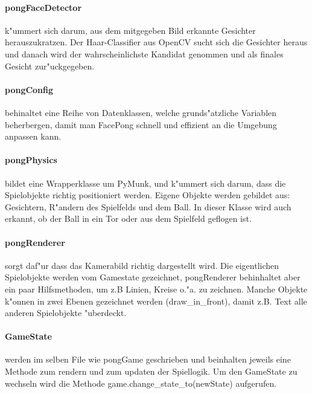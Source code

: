 \documentclass[12pt]{article}
\begin{document}
\paragraph{pongFaceDetector}
k"ummert sich darum, aus dem mitgegeben Bild erkannte Gesichter herauszukratzen.
Der Haar-Classifier aus OpenCV sucht sich die Gesichter heraus und danach wird
der wahrscheinlichste Kandidat genommen und als finales Gesicht zur"uckgegeben.
\paragraph{pongConfig}
behinaltet eine Reihe von Datenklassen, welche grunds"atzliche Variablen beherbergen,
damit man FacePong schnell und effizient an die Umgebung anpassen kann.
\paragraph{pongPhysics}
bildet eine Wrapperklasse um PyMunk, und k"ummert sich darum, dass die Spielobjekte richtig
positioniert werden. Eigene Objekte werden gebildet aus: Gesichtern, R"andern des Spielfelds und 
dem Ball. In dieser Klasse wird auch erkannt, ob der Ball in ein Tor oder aus dem Spielfeld
geflogen ist.
\paragraph{pongRenderer}
sorgt daf"ur dass das Kamerabild richtig dargestellt wird. Die eigentlichen Spielobjekte
werden vom Gamestate gezeichnet, pongRenderer behinhaltet aber ein paar Hilfsmethoden,
um z.B Linien, Kreise o."a. zu zeichnen. Manche Objekte k"onnen in zwei Ebenen gezeichnet
werden (draw\_in\_front), damit z.B. Text alle anderen Spielobjekte "uberdeckt.
\paragraph{GameState}
werden im selben File wie pongGame geschrieben und beinhalten jeweils eine Methode zum 
rendern und zum updaten der Spiellogik. Um den GameState zu wechseln wird die Methode
game.change\_state\_to(newState) aufgerufen.
\end{document}
